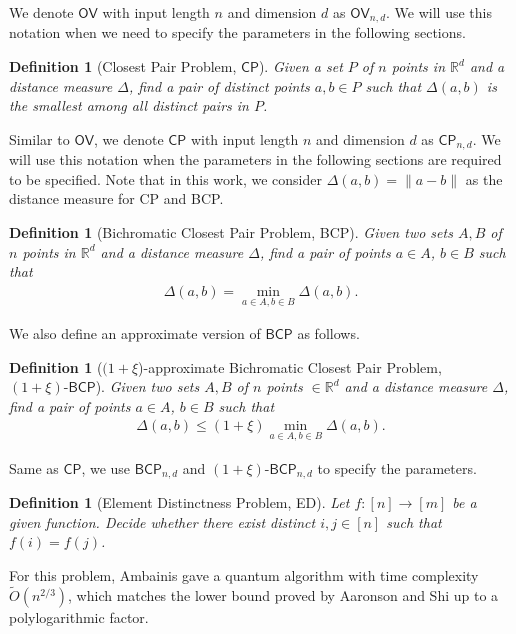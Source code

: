 \documentclass[10pt,a4paper]{article}
\newtheorem{definition}[theorem]{Definition}
\newcommand{\wt}{\widetilde}
\renewcommand{\tilde}{\wt}
\newcommand{\norm}[1]{\| #1 \|}
\newcommand{\CP}{\ensuremath{\mathsf{CP}}}
\newcommand{\OV}{\ensuremath{\mathsf{OV}}}
\newcommand{\BCP}{\ensuremath{\mathsf{BCP}}}
\newcommand{\xiBCP}{(1+\xi)\text{-}\mathsf{BCP}}
\begin{document}
We denote $\OV$ with input length $n$ and dimension $d$ as $\OV_{n,d}$. We will use this notation when we need to specify the parameters in the following sections.  

\begin{definition}[Closest Pair Problem, $\CP$]
Given a set $P$ of $n$ points in $\mathbb R^d$ and a distance measure $\Delta$, find a pair of distinct points $a,b\in P$ such that $\Delta(a,b)$ is the smallest among all distinct pairs in $P$.
\end{definition}
Similar to $\OV$, we denote $\CP$ with input length $n$ and dimension $d$ as $\CP_{n,d}$. We will use this notation when the parameters in the following sections are required to be specified. Note that in this work, we consider $\Delta(a, b) = \norm{a-b}$ as the distance measure for \textsf{CP} and \textsf{BCP}.

\begin{definition}[Bichromatic Closest Pair Problem, \textsf{BCP}]
Given two sets $A,B$ of $n$ points in $\mathbb R^d$ and a distance measure $\Delta$, find a pair of points $a\in A$, $b\in B$ such that 
\begin{align}
    \Delta(a,b)= \min_{a\in A,b\in B} \Delta(a,b).
\end{align}
\end{definition}
We also define an approximate version of $\BCP$ as follows.
\begin{definition}[$(1+\xi$)-approximate Bichromatic Closest Pair Problem, $\xiBCP$]
Given two sets $A,B$ of $n$ points $\in \mathbb R^d$ and a distance measure $\Delta$, find a pair of points $a\in A$, $b\in B$ such that 
\begin{align}
    \Delta(a,b) \leq (1+\xi)\min_{a\in A,b\in B} \Delta(a,b).
\end{align}
\end{definition}
Same as $\CP$, we use $\BCP_{n,d}$ and $\xiBCP_{n, d}$ to specify the parameters. 

\begin{definition}[Element Distinctness Problem, \textsf{ED}]
  Let $f:[n] \rightarrow [m]$ be a given function. Decide whether there exist distinct $i, j\in[n]$ such that $f(i) = f(j)$.
\end{definition}

For this problem, Ambainis \cite{r5} gave a quantum algorithm with time complexity $\tilde{O}(n^{2/3})$, which matches the lower bound proved by Aaronson and Shi \cite{r1} up to a polylogarithmic factor.
\end{document}
